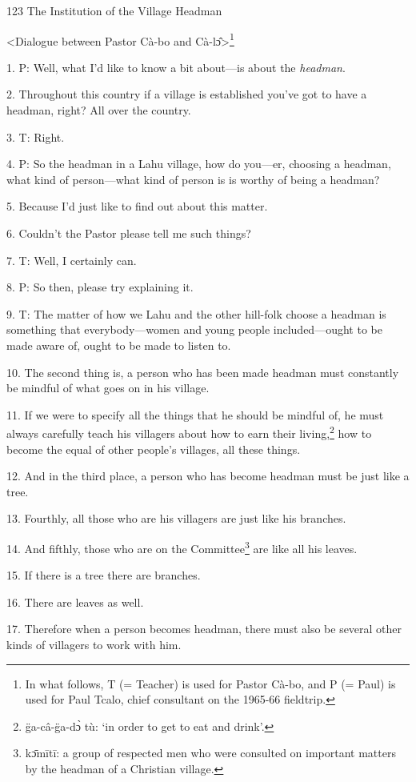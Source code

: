 
123 The Institution of the Village Headman

<Dialogue between Pastor Cà-bo and Cà-lɔ̂>\footnote{In what follows, T (= Teacher) is used for Pastor Cà-bo, and P (= Paul) is used for Paul Tcalo, chief consultant on the 1965-66 fieldtrip.}

1. P: Well, what I'd like to know a bit about---is about the \textit{headman}.

2. Throughout this country if a village is established you've got to have a headman,
right? All over the country.

3. T: Right.

4. P: So the headman in a Lahu village, how do you---er, choosing a headman, what
kind of person---what kind of person is is worthy of being a headman?

5. Because I'd just like to find out about this matter.

6. Couldn't the Pastor please tell me such things?

7. T: Well, I certainly can.

8. P: So then, please try explaining it.

9. T: The matter of how we Lahu and the other hill-folk choose a headman is something
that everybody---women and young people included---ought to be made aware of, ought
to be made to listen to.

10. The second thing is, a person who has been made headman must constantly be
mindful of what goes on in his village.

11. If we were to specify all the things that he should be mindful of, he must
always carefully teach his villagers about how to earn their living,\footnote{g̈a-câ-g̈a-dɔ̀ tù: `in order to get to eat and drink'.} how to
become the equal of other people's villages, all these things.

12. And in the third place, a person who has become headman must be just like a
tree.

13. Fourthly, all those who are his villagers are just like his branches.

14. And fifthly, those who are on the Committee\footnote{kɔ̄mītī: a group of respected men who were consulted on important matters by the headman of a Christian village.} are like all his leaves.

15. If there is a tree there are branches.

16. There are leaves as well.

17. Therefore when a person becomes headman, there must also be several other kinds
of villagers to work with him.

